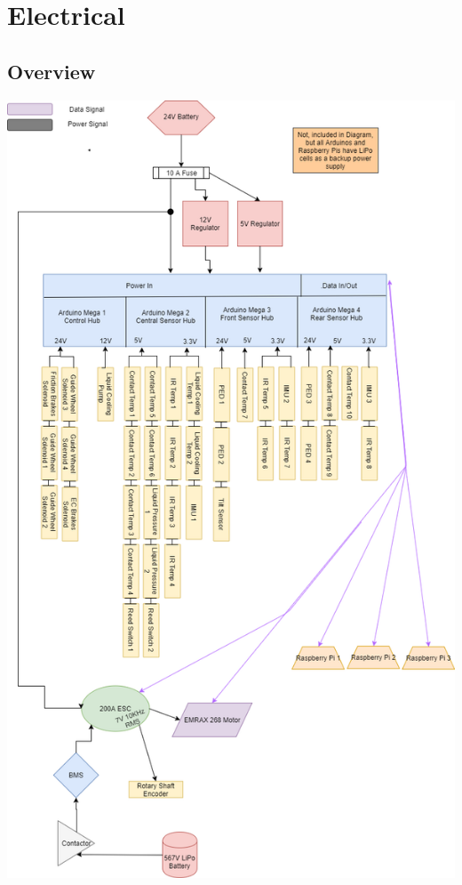 \documentclass[main.tex]{subfiles}
\begin{document}
    \chapter{Electrical}
    \label{ch:electrical}

	\section{Overview}
    \includegraphics[height=0.9\textheight]{images/EE_Block__1_.png}
\end{document}
